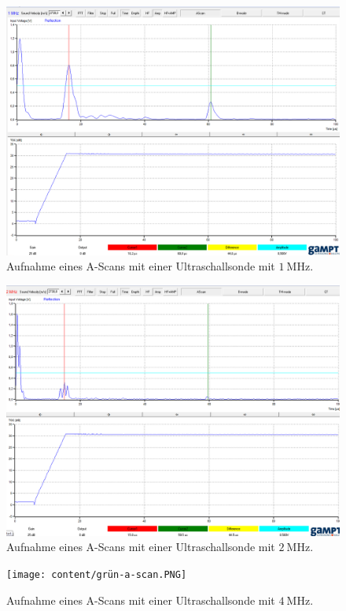 \begin{figure}
  \centering
  \includegraphics[scale=0.3]{content/blau-a-scan.PNG}
  \caption{Aufnahme eines A-Scans mit einer Ultraschallsonde mit $\SI{1}{\mega\hertz}$.}
  \label{fig:Ascanblau}
\end{figure}

\begin{figure}
  \centering
  \includegraphics[scale=0.3]{content/rot-a-scan.PNG}
  \caption{Aufnahme eines A-Scans mit einer Ultraschallsonde mit $\SI{2}{\mega\hertz}$.}
  \label{fig:Ascanrot}
\end{figure}

\begin{figure}
  \centering
  \texttt{[image: content/grün-a-scan.PNG]}
  \caption{Aufnahme eines A-Scans mit einer Ultraschallsonde mit $\SI{4}{\mega\hertz}$.}
  \label{fig:Ascangruen}
\end{figure}


